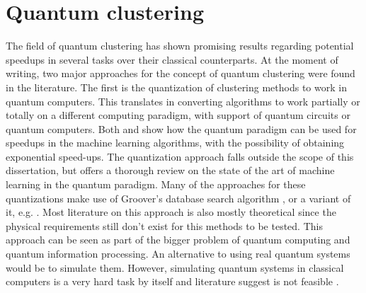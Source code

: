 %
%

\section{Quantum clustering}
\label{sec:quantum clustering}


The field of quantum clustering has shown promising results regarding potential speedups in several tasks over their classical counterparts. 
At the moment of writing, two major approaches for the concept of quantum clustering were found in the literature.
The first is the quantization of clustering methods to work in quantum computers.
This translates in converting algorithms to work partially or totally on a different computing paradigm, with support of quantum circuits or quantum computers.
Both \cite{Aimeur2013} and \cite{Lloyd2013} show how the quantum paradigm can be used for speedups in the machine learning algorithms, with the possibility of obtaining exponential speed-ups.
The quantization approach falls outside the scope of this dissertation, but \cite{wittek2014quantum} offers a thorough review on the state of the art of machine learning in the quantum paradigm.
Many of the approaches for these quantizations make use of Groover's database search algorithm \cite{grover1996fast}, or a variant of it, e.g. \cite{Wiebe2014}.
Most literature on this approach is also mostly theoretical since the physical requirements still don't exist for this methods to be tested.
This approach can be seen as part of the bigger problem of quantum computing and quantum information processing.
An alternative to using real quantum systems would be to simulate them.
However, simulating quantum systems in classical computers is a very hard task by itself and literature suggest is not feasible \cite{Feynman1982}.

